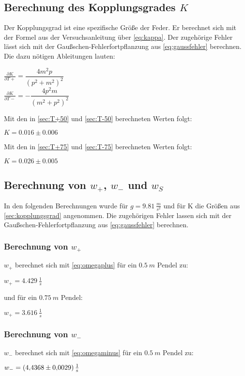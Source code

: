 \subsection{Berechnung des Kopplungsgrades $K$}
\label{sec:kopplungsgrad}
Der Kopplungsgrad ist eine spezifische Größe der Feder.
Er berechnet sich mit der Formel aus der Versuchsanleitung
über \autoref{eq:kappa}. Der zugehörige Fehler lässt sich mit der Gaußschen-Fehlerfortpflanzung aus 
\autoref{eq:gaussfehler} berechnen. Die dazu nötigen Ableitungen lauten:
\begin{center}
  


  $\frac{\partial K}{\partial T+}=\dfrac{4m^2p}{\left(p^2+m^2\right)^2}$\\
  $\frac{\partial K}{\partial T-}=-\dfrac{4p^2m}{\left(m^2+p^2\right)^2}$
\end{center}
Mit den in \autoref{sec:T+50} und \autoref{sec:T-50} berechneten Werten folgt:
\begin{center}
  $K=0.016\pm0.006$
\end{center}
Mit den in \autoref{sec:T+75} und \autoref{sec:T-75} berechneten Werten folgt:

\begin{center}
  $K=0.026\pm0.005$
\end{center}

\subsection{Berechnung von $w_+$, $w_-$ und $w_S$}
In den folgenden Berechnungen wurde für $g=\SI{9,81}{\frac{m}{s^2}}$ und für K die Größen aus
\autoref{sec:kopplungsgrad} angenommen. Die zugehörigen Fehler lassen sich mit der 
Gaußschen-Fehlerfortpflanzung aus \autoref{eq:gaussfehler} berechnen.

\subsubsection{Berechnung von $w_+$}
$w_+$ berechnet sich mit \autoref{eq:omegaplus} für ein $\SI{0,5}{m}$ Pendel zu:
\begin{center}
  $w_+=\SI{4.429}{\frac{1}{s}}$
\end{center}
und für ein $\SI{0,75}{m}$ Pendel:
\begin{center}
  $w_+=\SI{3.616}{\frac{1}{s}}$
\end{center}
\subsubsection{Berechnung von $w_-$}
$w_-$ berechnet sich mit \autoref{eq:omegaminus} für ein $\SI{0,5}{m}$ Pendel zu:
\begin{center}
  $w_-=\SI{4.4368\pm0.0029}{\frac{1}{s}}$
\end{center}

